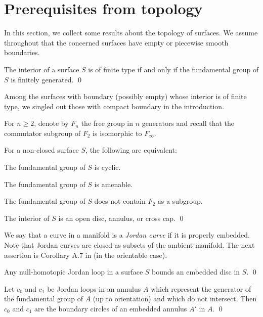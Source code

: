 \section{Prerequisites from topology}
In this section, we collect some results about the topology of surfaces.
We assume throughout that the concerned surfaces
have empty or piecewise smooth boundaries.

\begin{prop}\label{funfin}
The interior of a surface $S$ is of finite type
if and only if the fundamental group of $S$ is finitely generated. \qed
\end{prop}

Among the surfaces with boundary (possibly empty)
whose interior is of finite type,
we singled out those with compact boundary in the introduction.

For $n\ge2$, denote by $F_n$ the free group in $n$ generators
and recall that the commutator subgroup of $F_2$ is isomorphic to $F_\infty$.

\begin{prop}\label{amabel}
For a non-closed surface $S$, the following are equivalent:
\begin{compactenum}[1)]
\item
The fundamental group of $S$ is cyclic.
\item
The fundamental group of $S$ is amenable.
\item
The fundamental group of $S$ does not contain $F_2$ as a subgroup.
\item
The interior of $S$ is an open disc, annulus, or cross cap. \qed
\end{compactenum}
\end{prop}

We say that a curve in a manifold is a \emph{Jordan curve} if it is properly embedded.
Note that Jordan curves are closed as subsets of the ambient manifold.
The next assertion is Corollary A.7 in \cite{Bu2} (in the orientable case).

\begin{prop}\label{lemdisc}
Any null-homotopic Jordan loop in a surface $S$ bounds an embedded disc in $S$. \qed
\end{prop}

\begin{cor}\label{annulus}
Let $c_0$ and $c_1$ be Jordan loops in an annulus $A$
which represent the generator of the fundamental group of $A$
(up to orientation) and which do not intersect.
Then $c_0$ and $c_1$ are the boundary circles of an embedded annulus $A'$ in $A$. \qed
\end{cor}

